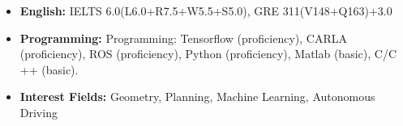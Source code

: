   \begin{itemize}[leftmargin=*]
  	\item \textbf{English:} IELTS 6.0(L6.0+R7.5+W5.5+S5.0), GRE 311(V148+Q163)+3.0
    \item \textbf{Programming:} Programming: Tensorflow (proficiency), CARLA (proficiency), ROS (proficiency), Python
    (proficiency), Matlab (basic), C/C ++ (basic).
    \item \textbf{Interest Fields:} Geometry, Planning, Machine Learning, Autonomous Driving
  \end{itemize}